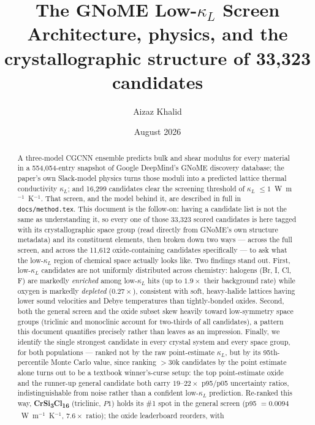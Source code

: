 \documentclass[11pt,a4paper]{article}
\title{\vspace{-1.5cm}\textbf{The GNoME Low-\texorpdfstring{$\kappa_L$}{kappa\_L} Screen}\\[4pt]
\large Architecture, physics, and the crystallographic structure of 33{,}323 candidates}
\author{Aizaz Khalid}
\date{August 2026}
\newcommand{\KL}{$\kappa_L$}
\begin{document}
\maketitle
\vspace{-0.8cm}

\begin{abstract}
\noindent
A three-model CGCNN ensemble predicts bulk and shear modulus for every
material in a 554{,}054-entry snapshot of Google DeepMind's GNoME discovery
database; the paper's own Slack-model physics turns those moduli into a
predicted lattice thermal conductivity \KL{}; and 16{,}299 candidates clear
the screening threshold of \KL{} $\leq 1$~W~m$^{-1}$~K$^{-1}$. That screen,
and the model behind it, are described in full in \texttt{docs/method.tex}.
This document is the follow-on: having a candidate list is not the same as
understanding it, so every one of those 33{,}323 scored candidates is here
tagged with its crystallographic space group (read directly from GNoME's own
structure metadata) and its constituent elements, then broken down two ways
--- across the full screen, and across the 11{,}612 oxide-containing
candidates specifically --- to ask what the low-\KL{} region of chemical
space actually looks like. Two findings stand out. First, low-\KL{}
candidates are not uniformly distributed across chemistry: halogens (Br, I,
Cl, F) are markedly \emph{enriched} among low-\KL{} hits (up to $1.9\times$
their background rate) while oxygen is markedly \emph{depleted}
($0.27\times$), consistent with soft, heavy-halide lattices having lower
sound velocities and Debye temperatures than tightly-bonded oxides. Second,
both the general screen and the oxide subset skew heavily toward
low-symmetry space groups (triclinic and monoclinic account for two-thirds
of all candidates), a pattern this document quantifies precisely rather than
leaves as an impression. Finally, we identify the single strongest candidate
in every crystal system and every space group, for both populations ---
ranked not by the raw point-estimate \KL{}, but by its 95th-percentile Monte
Carlo value, since ranking $>30$k candidates by the point estimate alone
turns out to be a textbook winner's-curse setup: the top point-estimate
oxide and the runner-up general candidate both carry $19$--$22\times$
p95/p05 uncertainty ratios, indistinguishable from noise rather than a
confident low-\KL{} prediction. Re-ranked this way,
\textbf{CrSi\textsubscript{3}Cl\textsubscript{16}} (triclinic, $P1$) holds
its \#1 spot in the general screen (p95 $=0.0094$~W~m$^{-1}$~K$^{-1}$,
$7.6\times$ ratio); the oxide leaderboard reorders, with

\end{abstract}
\end{document}

